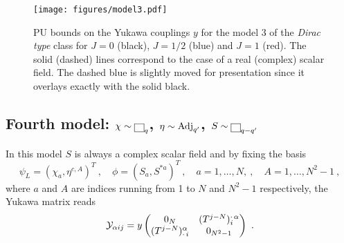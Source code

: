 \documentclass[a4paper,11pt]{article}
\newcommand{\be}{\begin{equation}}
\newcommand{\ee}{\end{equation}}
\begin{document}
\begin{figure}[t!]
\begin{center}
\texttt{[image: figures/model3.pdf]} 
\caption{\small PU bounds on the Yukawa couplings $y$ for the model 3 of the {\emph{Dirac type}} class
for $J=0$ (black), $J=1/2$ (blue) and $J=1$ (red).
The solid (dashed) lines correspond to the case of a real (complex) scalar field.  The dashed blue is slightly moved for presentation since it overlays exactly with the solid black.}
\label{fig:model3}
\end{center}
\end{figure}















\subsection{Fourth model: $\chi\sim {\tiny{\fbox{$\protect\phantom s$} }}_q$, 
$\eta\sim {\rm Adj}_{q^\prime}$, $S\sim {\tiny{\fbox{$\protect\phantom s$} }}_{q-q^\prime}$  }\label{sec:model4}



In this model $S$ is always a complex scalar field and by fixing the basis
\be
\psi_L = (\chi_{a}, \eta^{c,A})^T \ , \quad \phi = (S_a,S^{*a})^T \ , \quad a=1,\dots,N, \ , \quad A = 1,\dots, N^2-1 \ ,
\ee
where $a$ and $A$ are indices running from 1 to $N$ and $N^2-1$ respectively, the Yukawa matrix reads
\be
{\cal Y}_{\alpha i j } =y
\begin{pmatrix}
0_N & (T^{j-N})_i^{\cdot \,\alpha} \\
(T^{j-N})^{\alpha}_{\cdot \, i} & 0_{N^2-1}
\end{pmatrix} \ .
\ee
\end{document}
